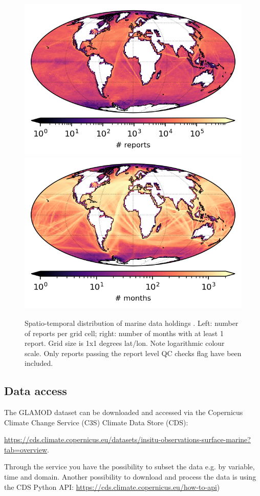 \begin{figure}[h]
\includegraphics{resources/header-reports-map-optimal.png}
\includegraphics{resources/header-months-map-optimal.png}
\caption{Spatio-temporal distribution of marine data holdings \datatimerange{}. Left: number of reports per grid cell; right: number of months with at least 1 report. Grid size is 1x1 degrees lat/lon. Note logarithmic colour scale. Only reports passing the report level QC checks flag have been included. \\}
\label{fig:nreports-map1}
\end{figure}
\FloatBarrier
\newpage

\subsection{Data access}
The GLAMOD dataset can be downloaded and accessed via the Copernicus Climate Change Service (C3S) Climate Data Store (CDS):
\begin{center}
\sloppy\url{https://cds.climate.copernicus.eu/datasets/insitu-observations-surface-marine?tab=overview}.
 \end{center}
Through the service you have the possibility to subset the data e.g. by variable, time and domain.
Another possibility to download and process the data is using the CDS Python API:
 \url{https://cds.climate.copernicus.eu/how-to-api}) 

